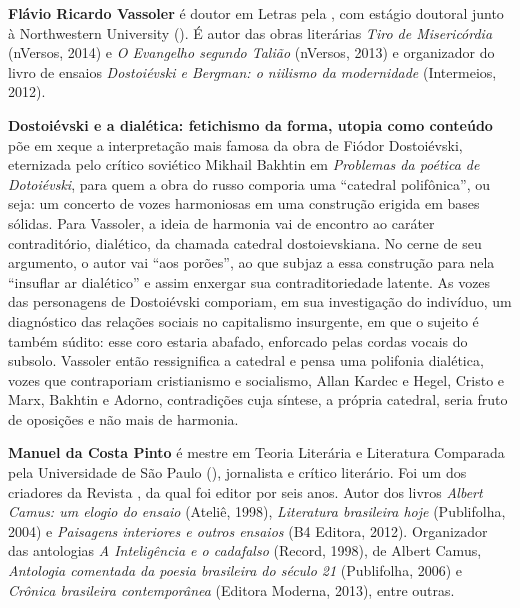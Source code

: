
\textbf{Flávio Ricardo Vassoler} é doutor em Letras pela , com estágio doutoral junto à
  Northwestern University (). É autor das obras literárias \emph{Tiro
  de Misericórdia} (nVersos, 2014) e \emph{O Evangelho segundo Talião}
  (nVersos, 2013) e organizador do livro de ensaios \emph{Dostoiévski e
  Bergman: o niilismo da modernidade} (Intermeios, 2012).

\textbf{Dostoiévski e a dialética: fetichismo da forma, utopia como conteúdo} põe em xeque a interpretação mais famosa da obra de Fiódor Dostoiévski, eternizada pelo crítico soviético Mikhail Bakhtin em \emph{Problemas da poética de Dotoiévski}, para quem a obra do russo comporia uma ``catedral polifônica'', ou seja: um concerto de vozes harmoniosas em uma construção erigida em bases sólidas. Para Vassoler, a ideia de harmonia vai de encontro ao caráter contraditório, dialético, da chamada catedral dostoievskiana. No cerne de seu argumento, o autor vai “aos porões”, ao que subjaz a essa construção para nela “insuflar ar dialético” e assim enxergar sua contraditoriedade latente. As vozes das personagens de Dostoiévski comporiam, em sua investigação do indivíduo, um diagnóstico das relações sociais no capitalismo insurgente, em que o sujeito é também súdito: esse coro estaria abafado, enforcado pelas cordas vocais do subsolo. Vassoler então ressignifica a catedral e pensa uma polifonia dialética, vozes que contraporiam cristianismo e socialismo, Allan Kardec e Hegel, Cristo e Marx, Bakhtin e Adorno, contradições cuja síntese, a própria catedral, seria fruto de oposições e não mais de harmonia.  

\textbf{Manuel da Costa Pinto} é mestre em Teoria Literária e Literatura Comparada pela Universidade de São Paulo (), jornalista e crítico literário. Foi um dos criadores da Revista , da qual foi editor por seis anos. Autor dos livros \emph{Albert Camus: um elogio do ensaio} (Ateliê, 1998), \emph{Literatura brasileira hoje} (Publifolha, 2004) e \emph{Paisagens interiores e outros ensaios} (B4 Editora, 2012). Organizador das antologias \emph{A Inteligência e o cadafalso} (Record, 1998), de Albert Camus, \emph{Antologia comentada da poesia brasileira do século 21} (Publifolha, 2006) e \emph{Crônica brasileira contemporânea} (Editora Moderna, 2013), entre outras.






